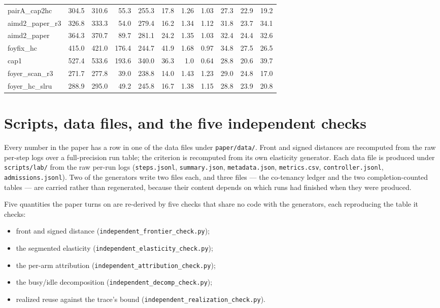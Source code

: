 \documentclass[10pt]{article}
\begin{document}
\begin{landscape}
\begin{center}
\begin{tabular}{lrrrrrrrrrr}
pairA\_cap2hc & 304.5 & 310.6 & 55.3 & 255.3 & 17.8 & 1.26 & 1.03 & 27.3 & 22.9 & 19.2 \\
aimd2\_paper\_r3 & 326.8 & 333.3 & 54.0 & 279.4 & 16.2 & 1.34 & 1.12 & 31.8 & 23.7 & 34.1 \\
aimd2\_paper & 364.3 & 370.7 & 89.7 & 281.1 & 24.2 & 1.35 & 1.03 & 32.4 & 24.4 & 32.6 \\
foyfix\_hc & 415.0 & 421.0 & 176.4 & 244.7 & 41.9 & 1.68 & 0.97 & 34.8 & 27.5 & 26.5 \\
cap1 & 527.4 & 533.6 & 193.6 & 340.0 & 36.3 & 1.0 & 0.64 & 28.8 & 20.6 & 39.7 \\
foyer\_scan\_r3 & 271.7 & 277.8 & 39.0 & 238.8 & 14.0 & 1.43 & 1.23 & 29.0 & 24.8 & 17.0 \\
foyer\_hc\_slru & 288.9 & 295.0 & 49.2 & 245.8 & 16.7 & 1.38 & 1.15 & 28.8 & 23.9 & 20.8 \\
\bottomrule
\end{tabular}\end{center}\end{landscape}

\section{Scripts, data files, and the five independent checks}

Every number in the paper has a row in one of the data files under
\texttt{paper/data/}. Front and signed distances are recomputed from the raw
per-step logs over a full-precision run table; the criterion is recomputed from
its own elasticity generator. Each data file is produced under
\texttt{scripts/lab/} from the raw per-run logs
(\texttt{steps.jsonl}, \texttt{summary.json}, \texttt{metadata.json},
\texttt{metrics.csv}, \texttt{controller.jsonl}, \texttt{admissions.jsonl}).
Two of the generators write two files each, and three files --- the co-tenancy
ledger and
the two completion-counted tables --- are carried rather than regenerated,
because their content depends on which runs had finished when they were
produced.

Five quantities the paper turns on are re-derived by five checks that share no
code with the generators, each reproducing the table it checks:

\begin{itemize}
\item front and signed distance (\texttt{independent\_frontier\_check.py});
\item the segmented elasticity (\texttt{independent\_elasticity\_check.py});
\item the per-arm attribution (\texttt{independent\_attribution\_check.py});
\item the busy/idle decomposition (\texttt{independent\_decomp\_check.py});
\item realized reuse against the trace's bound
(\texttt{independent\_realization\_check.py}).
\end{itemize}
\end{document}
